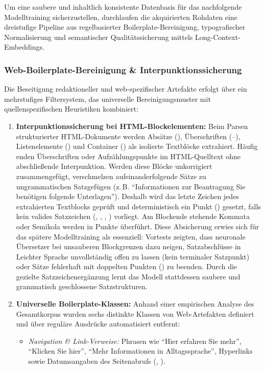 Um eine saubere und inhaltlich konsistente Datenbasis für das nachfolgende Modelltraining sicherzustellen, durchlaufen die akquirierten Rohdaten eine dreistufige Pipeline aus regelbasierter Boilerplate-Bereinigung, typografischer Normalisierung und semantischer Qualitätssicherung mittels Long-Context-Embeddings.

\subsubsection{Web-Boilerplate-Bereinigung \& Interpunktionssicherung}
Die Beseitigung redaktioneller und web-spezifischer Artefakte erfolgt über ein mehrstufiges Filtersystem, das universelle Bereinigungsmuster mit quellenspezifischen Heuristiken kombiniert:

\begin{enumerate}
    \item \textbf{Interpunktionssicherung bei HTML-Blockelementen:} Beim Parsen strukturierter HTML-Dokumente werden Absätze (), Überschriften (--), Listenelemente () und Container () als isolierte Textblöcke extrahiert. Häufig enden Überschriften oder Aufzählungspunkte im HTML-Quelltext ohne abschließende Interpunktion. Werden diese Blöcke unkorrigiert zusammengefügt, verschmelzen aufeinanderfolgende Sätze zu ungrammatischen Satzgefügen (z.\,B. \enquote{Informationen zur Beantragung Sie benötigen folgende Unterlagen}). Deshalb wird das letzte Zeichen jedes extrahierten Textblocks geprüft und deterministisch ein Punkt () gesetzt, falls kein valides Satzzeichen (, \code{!}, , \code{:}) vorliegt. Am Blockende stehende Kommata oder Semikola werden in Punkte überführt. Diese Absicherung erwies sich für das spätere Modelltraining als essenziell: Vortests zeigten, dass neuronale Übersetzer bei unsauberen Blockgrenzen dazu neigen, Satzabschlüsse in Leichter Sprache unvollständig offen zu lassen (kein terminaler Satzpunkt) oder Sätze fehlerhaft mit doppelten Punkten () zu beenden. Durch die gezielte Satzzeichenergänzung lernt das Modell stattdessen saubere und grammatisch geschlossene Satzstrukturen.
    \item \textbf{Universelle Boilerplate-Klassen:} Anhand einer empirischen Analyse des Gesamtkorpus wurden sechs distinkte Klassen von Web-Artefakten definiert und über reguläre Ausdrücke automatisiert entfernt:
    \begin{itemize}
        \item \textit{Navigation \& Link-Verweise:} Phrasen wie \enquote{Hier erfahren Sie mehr}, \enquote{Klicken Sie hier}, \enquote{Mehr Informationen in Alltagssprache}, Hyperlinks sowie Datumsangaben des Seitenabrufs (, ).

\end{itemize}
\end{enumerate}
